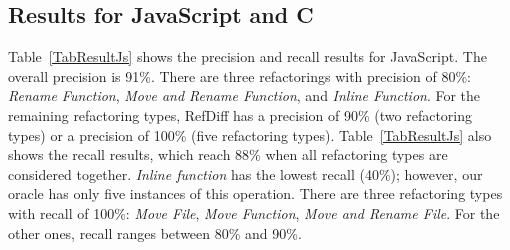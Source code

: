 \subsection{Results for JavaScript and C}
\label{sec:eval:js:c:results}

Table~\ref{TabResultJs} shows the precision and recall results for JavaScript. The overall precision is 91\%. There are three refactorings with precision of 80\%: \textit{Rename Function}, \textit{Move and Rename Function}, and \textit{Inline Function}. For the remaining refactoring types, RefDiff has a precision of 90\% (two refactoring types) or a precision of 100\% (five refactoring types). Table~\ref{TabResultJs} also shows the recall results, which reach 88\% when all refactoring types are considered together.
\textit{Inline function} has the lowest recall (40\%); however, our oracle has only five instances of this operation. There are three refactoring types with recall of 100\%: \textit{Move File}, \textit{Move Function}, \textit{Move and Rename File}. For the other ones, recall ranges between 80\% and 90\%.





